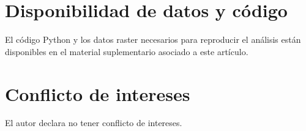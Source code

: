 \documentclass[12pt, a4paper]{article}
\begin{document}
\section*{Disponibilidad de datos y código}
El código Python y los datos raster necesarios para reproducir el análisis están disponibles en el material suplementario asociado 
a este artículo.

\section*{Conflicto de intereses}
El autor declara no tener conflicto de intereses.



\end{document}
